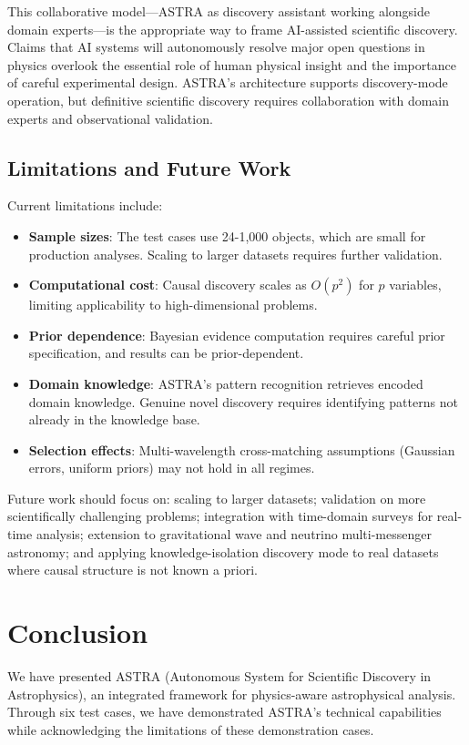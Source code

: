 \documentclass[usenatbib]{rasti}
\begin{document}
This collaborative model---ASTRA as discovery assistant working alongside domain experts---is the appropriate way to frame AI-assisted scientific discovery. Claims that AI systems will autonomously resolve major open questions in physics overlook the essential role of human physical insight and the importance of careful experimental design. ASTRA's architecture supports discovery-mode operation, but definitive scientific discovery requires collaboration with domain experts and observational validation.

\subsection{Limitations and Future Work}

Current limitations include:
\begin{itemize}
\item \textbf{Sample sizes}: The test cases use 24-1,000 objects, which are small for production analyses. Scaling to larger datasets requires further validation.
\item \textbf{Computational cost}: Causal discovery scales as $O(p^2)$ for $p$ variables, limiting applicability to high-dimensional problems.
\item \textbf{Prior dependence}: Bayesian evidence computation requires careful prior specification, and results can be prior-dependent.
\item \textbf{Domain knowledge}: ASTRA's pattern recognition retrieves encoded domain knowledge. Genuine novel discovery requires identifying patterns not already in the knowledge base.
\item \textbf{Selection effects}: Multi-wavelength cross-matching assumptions (Gaussian errors, uniform priors) may not hold in all regimes.
\end{itemize}

Future work should focus on: scaling to larger datasets; validation on more scientifically challenging problems; integration with time-domain surveys for real-time analysis; extension to gravitational wave and neutrino multi-messenger astronomy; and applying knowledge-isolation discovery mode to real datasets where causal structure is not known a priori.

\section{Conclusion}

We have presented ASTRA (Autonomous System for Scientific Discovery in Astrophysics), an integrated framework for physics-aware astrophysical analysis. Through six test cases, we have demonstrated ASTRA's technical capabilities while acknowledging the limitations of these demonstration cases.
\end{document}
